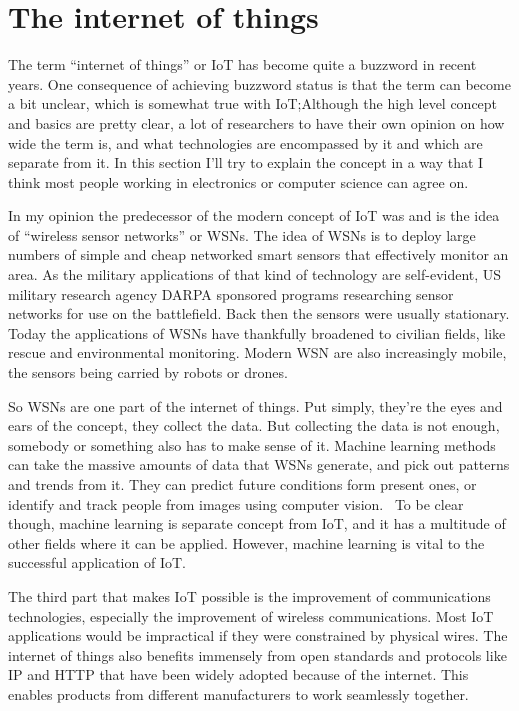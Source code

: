 \section{The internet of things}
\label{sec:iot}

The term ``internet of things'' or IoT has become quite a buzzword in recent
years. One consequence of achieving buzzword status is that the term can become
a bit unclear, which is somewhat true with IoT;\@ Although the high level
concept and basics are pretty clear, a lot of researchers to have their own
opinion on how wide the term is, and what technologies are encompassed by it
and which are separate from it. In this section I'll try to explain the concept
in a way that I think most people working in electronics or computer science
can agree on.

In my opinion the predecessor of the modern concept of IoT was and is the idea
of ``wireless sensor networks'' or WSNs. The idea of WSNs is to deploy large
numbers of simple and cheap networked smart sensors that effectively monitor an
area. As the military applications of that kind of technology are self-evident,
US military research agency DARPA sponsored programs researching sensor
networks for use on the battlefield. Back then the sensors were usually
stationary. Today the applications of WSNs have thankfully broadened to
civilian fields, like rescue and environmental monitoring. Modern WSN are also
increasingly mobile, the sensors being carried by robots or
drones.~\cite{Chong2003}

So WSNs are one part of the internet of things. Put simply, they're the eyes
and ears of the concept, they collect the data. But collecting the data is not
enough, somebody or something also has to make sense of it. Machine learning
methods can take the massive amounts of data that WSNs generate, and pick out
patterns and trends from it. They can predict future conditions form present
ones, or identify and track people from images using computer
vision.~\cite{Gubbi2013} To be clear though, machine learning is separate
concept from IoT, and it has a multitude of other fields where it can be
applied. However, machine learning is vital to the successful application of
IoT.

The third part that makes IoT possible is the improvement of communications
technologies, especially the improvement of wireless communications. Most IoT
applications would be impractical if they were constrained by physical wires.
The internet of things also benefits immensely from open standards and
protocols like IP and HTTP that have been widely adopted because of the
internet. This enables products from different manufacturers to work seamlessly
together.

